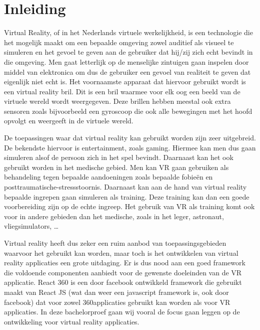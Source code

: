 
\chapter{Inleiding}
\label{ch:inleiding}
Virtual Reality, of in het Nederlands virtuele werkelijkheid, is een technologie die het mogelijk maakt om een bepaalde omgeving zowel auditief als visueel te simuleren en het gevoel te geven aan de gebruiker dat hij/zij zich echt bevindt in die omgeving. Men gaat letterlijk op de menselijke zintuigen gaan inspelen door middel van elektronica om dus de gebruiker een gevoel van realiteit te geven dat eigenlijk niet echt is. Het voornaamste apparaat dat hiervoor gebruikt wordt is een virtual reality bril. Dit is een bril waarmee voor elk oog een beeld van de virtuele wereld wordt weergegeven. Deze brillen hebben meestal ook extra sensoren zoals bijvoorbeeld een gyroscoop die ook alle bewegingen met het hoofd opvolgt en weergeeft in de virtuele wereld.

De toepassingen waar dat virtual reality kan gebruikt worden zijn zeer uitgebreid. De bekendste hiervoor is entertainment, zoals gaming. Hiermee kan men dus gaan simuleren alsof de persoon zich in het spel bevindt. Daarnaast kan het ook gebruikt worden in het medische gebied. Men kan VR gaan gebruiken als behandeling tegen bepaalde aandoeningen zoals bepaalde fobieën en posttraumatische-stressstoornis. Daarnaast kan aan de hand van virtual reality bepaalde ingrepen gaan simuleren als training. Deze training kan dan een goede voorbereiding zijn op de echte ingreep. Het gebruik van VR als training komt ook voor in andere gebieden dan het medische, zoals in het leger, astronaut, vliegsimulators, …

Virtual reality heeft dus zeker een ruim aanbod van toepassingsgebieden waarvoor het gebruikt kan worden, maar toch is het ontwikkelen van virtual reality applicaties een grote uitdaging. Er is dus nood aan een goed framework die voldoende componenten aanbiedt voor de gewenste doeleinden van de VR applicatie. React 360 is een door facebook ontwikkeld framework die gebruikt maakt van React JS (wat dan weer een javascript framework is, ook door facebook) dat voor zowel 360\textdegree applicaties gebruikt kan worden als voor VR applicaties. In deze bachelorproef gaan wij vooral de focus gaan leggen op de ontwikkeling voor virtual reality applicaties.

